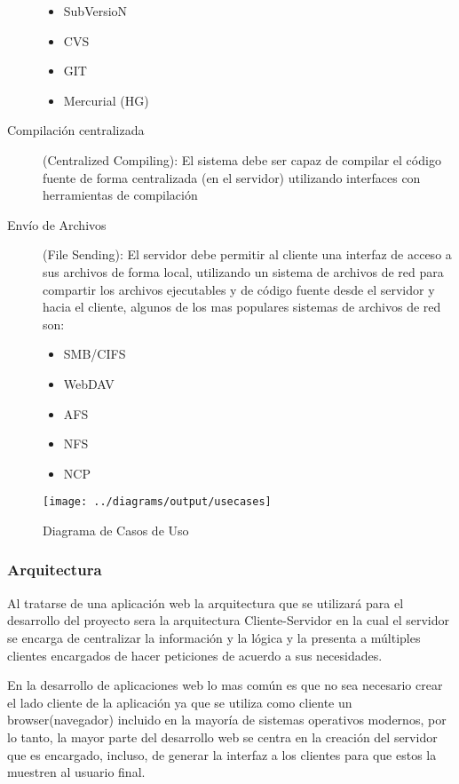 \begin{description}
	\begin{itemize}
		\item SubVersioN
		\item CVS
		\item GIT
		\item Mercurial (HG)
	\end{itemize}
	
	\item [Compilación centralizada] (Centralized Compiling): \newline
	El sistema debe ser capaz de compilar el código fuente de forma centralizada (en el servidor) utilizando interfaces con herramientas de compilación
	
	\item [Envío de Archivos] (File Sending): \newline
	El servidor debe permitir al cliente una interfaz de acceso a sus archivos de forma local, utilizando un sistema de archivos de red para compartir los archivos ejecutables y de código fuente desde el servidor y hacia el cliente, algunos de los mas populares sistemas de archivos de red son:
	
	\begin{itemize}
		\item SMB/CIFS
		\item WebDAV
		\item AFS
		\item NFS
		\item NCP
	\end{itemize}
	
\end{description}

\begin{figure}
 \centering
 \texttt{[image: ../diagrams/output/usecases]}
 \caption{Diagrama de Casos de Uso}
 \label{diagrama:casos_uso}
\end{figure}


\subsubsection{Arquitectura}

Al tratarse de una aplicación web la arquitectura que se utilizará para el desarrollo del proyecto sera la arquitectura Cliente-Servidor en la cual el servidor se encarga de centralizar la información y la lógica y la presenta a múltiples clientes encargados de hacer peticiones de acuerdo a sus necesidades.

En la desarrollo de aplicaciones web lo mas común es que no sea necesario crear el lado cliente de la aplicación ya que se utiliza como cliente un browser(navegador) incluido en la mayoría de sistemas operativos modernos, por lo tanto, la mayor parte del desarrollo web se centra en la creación del servidor que es encargado, incluso, de generar la interfaz a los clientes para que estos la muestren al usuario final.

